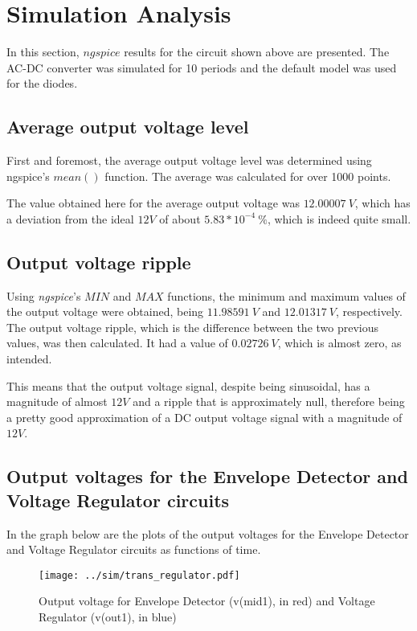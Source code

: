 \section{Simulation Analysis}
\label{sec:simulation}

In this section, $ngspice$ results for the circuit shown above are presented. The AC-DC converter was simulated for 10 periods and the default model was used for the diodes.




\subsection{Average output voltage level}
First and foremost, the average output voltage level was determined using ngspice's $mean()$ function. The average was calculated for over 1000 points.

The value obtained here for the average output voltage was $12.00007 \ V$,
which has a deviation from the ideal $12 V$ of about $5.83*10^{-4} \ \%$, which is indeed quite small.




\subsection{Output voltage ripple}
Using \textit{ngspice}'s $MIN$ and $MAX$ functions, the minimum and maximum values of the output voltage were obtained, being $11.98591 \ V$ and $12.01317 \ V$, respectively. The output voltage ripple, which is the difference between the two previous values, was then calculated. It had a value of $0.02726 \ V$, which is almost zero, as intended.


This means that the output voltage signal, despite being sinusoidal, has a magnitude of almost $12 V$ and a ripple that is approximately null, therefore being a pretty good approximation of a DC output voltage signal with a magnitude of $12 V$.




\subsection{Output voltages for the Envelope Detector and Voltage Regulator circuits}
In the graph below are the plots of the output voltages for the Envelope Detector and Voltage Regulator circuits as functions of time.

\begin{figure}[H] \centering
\texttt{[image: ../sim/trans\_regulator.pdf]}
\caption{Output voltage for Envelope Detector (v(mid1), in red) and Voltage Regulator (v(out1), in blue)}
\label{fig:ngspice_output}
\end{figure}


